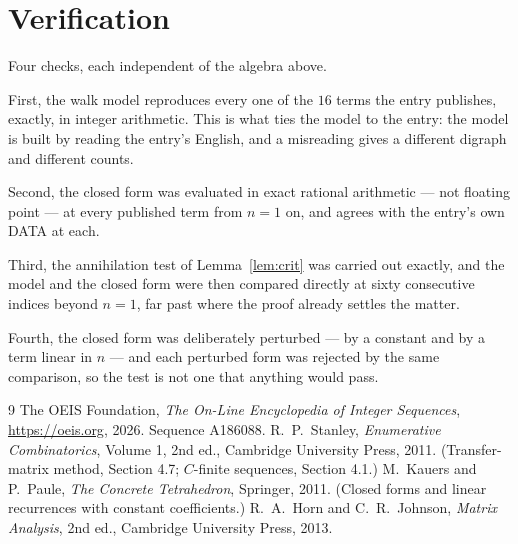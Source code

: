\documentclass[11pt,a4paper]{article}
\theoremstyle{plain}
\theoremstyle{definition}
\begin{document}
\section{Verification}

Four checks, each independent of the algebra above.

First, the walk model reproduces every one of the $16$ terms the entry publishes,
exactly, in integer arithmetic. This is what ties the model to the entry: the model is built
by reading the entry's English, and a misreading gives a different digraph and different
counts.

Second, the closed form was evaluated in exact rational arithmetic --- not floating point ---
at every published term from $n=1$ on, and agrees with the entry's own DATA at each.

Third, the annihilation test of Lemma~\ref{lem:crit} was carried out exactly, and the model
and the closed form were then compared directly at sixty consecutive indices beyond
$n=1$, far past where the proof already settles the matter.

Fourth, the closed form was deliberately perturbed --- by a constant and by a term linear in
$n$ --- and each perturbed form was rejected by the same comparison, so the test is not one
that anything would pass.

\begin{thebibliography}{9}
 The OEIS Foundation, \emph{The On-Line Encyclopedia of Integer
Sequences}, \url{https://oeis.org}, 2026. Sequence A186088.
 R.~P.~Stanley, \emph{Enumerative Combinatorics}, Volume 1, 2nd ed.,
Cambridge University Press, 2011. (Transfer-matrix method, Section 4.7; $C$-finite sequences,
Section 4.1.)
 M.~Kauers and P.~Paule, \emph{The Concrete Tetrahedron}, Springer, 2011.
(Closed forms and linear recurrences with constant coefficients.)
 R.~A.~Horn and C.~R.~Johnson, \emph{Matrix Analysis}, 2nd ed., Cambridge
University Press, 2013.
\end{thebibliography}
\end{document}
